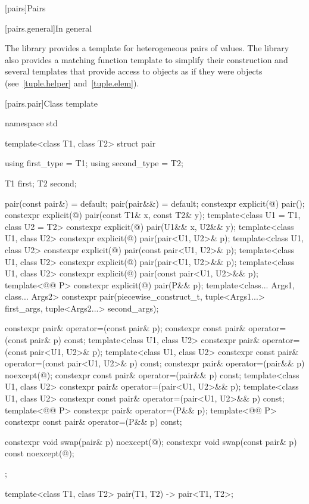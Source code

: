 [pairs]{Pairs}

[pairs.general]{In general}

\pnum
The library provides a template for heterogeneous pairs of values.
The library also provides a matching function template to simplify
their construction and several templates that provide access to 
objects as if they were  objects (see~\ref{tuple.helper}
and~\ref{tuple.elem}).%
%
%
%

[pairs.pair]{Class template }

%
\begin{codeblock}
namespace std {
  template<class T1, class T2>
  struct pair {
    using first_type  = T1;
    using second_type = T2;

    T1 first;
    T2 second;

    pair(const pair&) = default;
    pair(pair&&) = default;
    constexpr explicit(@\seebelow@) pair();
    constexpr explicit(@\seebelow@) pair(const T1& x, const T2& y);
    template<class U1 = T1, class U2 = T2>
      constexpr explicit(@\seebelow@) pair(U1&& x, U2&& y);
    template<class U1, class U2>
      constexpr explicit(@\seebelow@) pair(pair<U1, U2>& p);
    template<class U1, class U2>
      constexpr explicit(@\seebelow@) pair(const pair<U1, U2>& p);
    template<class U1, class U2>
      constexpr explicit(@\seebelow@) pair(pair<U1, U2>&& p);
    template<class U1, class U2>
      constexpr explicit(@\seebelow@) pair(const pair<U1, U2>&& p);
    template<@@ P>
      constexpr explicit(@\seebelow@) pair(P&& p);
    template<class... Args1, class... Args2>
      constexpr pair(piecewise_construct_t,
                     tuple<Args1...> first_args, tuple<Args2...> second_args);

    constexpr pair& operator=(const pair& p);
    constexpr const pair& operator=(const pair& p) const;
    template<class U1, class U2>
      constexpr pair& operator=(const pair<U1, U2>& p);
    template<class U1, class U2>
      constexpr const pair& operator=(const pair<U1, U2>& p) const;
    constexpr pair& operator=(pair&& p) noexcept(@\seebelow@);
    constexpr const pair& operator=(pair&& p) const;
    template<class U1, class U2>
      constexpr pair& operator=(pair<U1, U2>&& p);
    template<class U1, class U2>
      constexpr const pair& operator=(pair<U1, U2>&& p) const;
    template<@@ P>
      constexpr pair& operator=(P&& p);
    template<@@ P>
      constexpr const pair& operator=(P&& p) const;

    constexpr void swap(pair& p) noexcept(@\seebelow@);
    constexpr void swap(const pair& p) const noexcept(@\seebelow@);
  };

  template<class T1, class T2>
    pair(T1, T2) -> pair<T1, T2>;
}
\end{codeblock}

